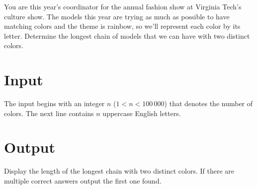 

You are this year’s coordinator for the annual fashion show at Virginia Tech’s culture show. 
The models this year are trying as much as possible to have matching colors and the theme
is rainbow, so we’ll represent each color by its letter. Determine the longest chain of models
that we can have with two distinct colors. 

\section*{Input}

The input begins with an integer $n$ ($1 < n < 100\,000$) that denotes the number
of colors.  The next line contains $n$ uppercase English letters.

\section*{Output}

Display the length of the longest chain with two distinct colors.
If there are multiple correct answers output the first one found. 

